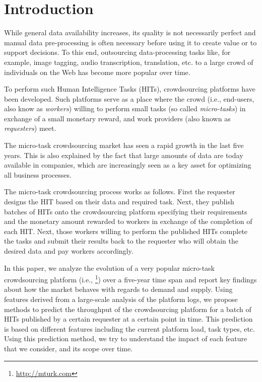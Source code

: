 \section{Introduction}\label{sec:intro}
% 
While general data availability increases, its quality is not necessarily perfect and manual data pre-processing is often necessary before using it to create value or to support decisions.
% 
To this end, outsourcing  data-processing tasks like, for example, image tagging, audio transcription, translation, etc. to a large crowd of individuals on the Web has become more popular over time.

To perform such Human Intelligence Tasks (HITs), crowdsourcing platforms have been developed. Such platforms serve as a place where the crowd (i.e., end-users, also know as \emph{workers}) willing to perform small tasks (so called \emph{micro-tasks}) in exchange of a small monetary reward, and work providers (also known as \emph{requesters}) meet. 

The micro-task crowdsourcing market has seen a rapid growth in the last five years. This is also explained by the fact that large amounts of data are today available in companies, which are increasingly seen as a key asset for optimizing all business processes.

The  micro-task crowdsourcing process works as follows. First the requester designs the HIT based on their data and required task. Next, they publish batches of HITs onto the crowdsourcing platform specifying their requirements and the monetary amount rewarded to workers in exchange of the completion of each HIT. Next, those workers willing to perform the published HITs complete the tasks and submit their results back to the requester who will obtain the desired data and pay workers accordingly.

In this paper, we analyze the evolution of a very popular micro-task crowdsourcing platform (i.e., \amt{}\footnote{\url{http://mturk.com}}) over a  five-year time span and report key findings about how
the market behaves with regards to demand and supply.
% 
Using features derived from a large-scale analysis of the platform logs, we propose methods to predict the throughput of the crowdsourcing platform for a batch of HITs published by a certain requester at a certain point in time. This prediction is based on different features including the current platform load, task types, etc. Using this prediction method, we try to understand the impact of each feature that we consider, and its scope over time.

